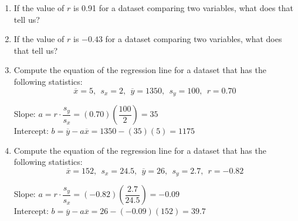 \begin{enumerate}
\item If the value of $r$ is 0.91 for a dataset comparing two variables, what does that tell us? 

\item If the value of $r$ is $-0.43$ for a dataset comparing two variables, what does that tell us? 

\item Compute the equation of the regression line for a dataset that has the following statistics:
\[\overline{x} = 5,\ \ s_x = 2,\ \ \overline{y} = 1350,\ \ s_y = 100,\ \ r = 0.70\]
\text{} 
\begin{center}
Slope: $a = r \cdot \dfrac{s_y}{s_x} = (0.70)\left(\dfrac{100}{2}\right) = 35$\\
Intercept: $b = \overline{y} - a \overline{x} = 1350 - (35)(5) = 1175$
\end{center}

\item Compute the equation of the regression line for a dataset that has the following statistics:
\[\overline{x} = 152,\ \ s_x = 24.5,\ \ \overline{y} = 26,\ \ s_y = 2.7,\ \ r = -0.82\]
\text{} 
\begin{center}
Slope: $a = r \cdot \dfrac{s_y}{s_x} = (-0.82)\left(\dfrac{2.7}{24.5}\right) = -0.09$\\
Intercept: $b = \overline{y} - a \overline{x} = 26 - (-0.09)(152) = 39.7$
\end{center}
\end{enumerate}

